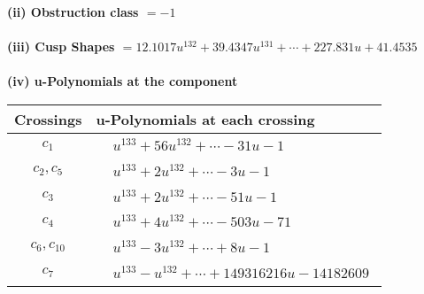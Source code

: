 \documentclass[1p]{elsarticle_modified}
\theoremstyle{definition}
\begin{document}
\flushleft \textbf{(ii) Obstruction class $= -1$}\\~\\
\flushleft \textbf{(iii) Cusp Shapes $= 12.1017 u^{132}+39.4347 u^{131}+\cdots+227.831 u+41.4535$}\\~\\
\newpage\renewcommand{\arraystretch}{1}
\flushleft \textbf{(iv) u-Polynomials at the component}\newline \\
\begin{tabular}{m{50pt}|m{274pt}}
Crossings & \hspace{64pt}u-Polynomials at each crossing \\
\hline $$\begin{aligned}c_{1}\end{aligned}$$&$\begin{aligned}
&u^{133}+56 u^{132}+\cdots-31 u-1
\end{aligned}$\\
\hline $$\begin{aligned}c_{2},c_{5}\end{aligned}$$&$\begin{aligned}
&u^{133}+2 u^{132}+\cdots-3 u-1
\end{aligned}$\\
\hline $$\begin{aligned}c_{3}\end{aligned}$$&$\begin{aligned}
&u^{133}+2 u^{132}+\cdots-51 u-1
\end{aligned}$\\
\hline $$\begin{aligned}c_{4}\end{aligned}$$&$\begin{aligned}
&u^{133}+4 u^{132}+\cdots-503 u-71
\end{aligned}$\\
\hline $$\begin{aligned}c_{6},c_{10}\end{aligned}$$&$\begin{aligned}
&u^{133}-3 u^{132}+\cdots+8 u-1
\end{aligned}$\\
\hline $$\begin{aligned}c_{7}\end{aligned}$$&$\begin{aligned}
&u^{133}- u^{132}+\cdots+149316216 u-14182609
\end{aligned}$\\

\end{tabular}
\end{document}

